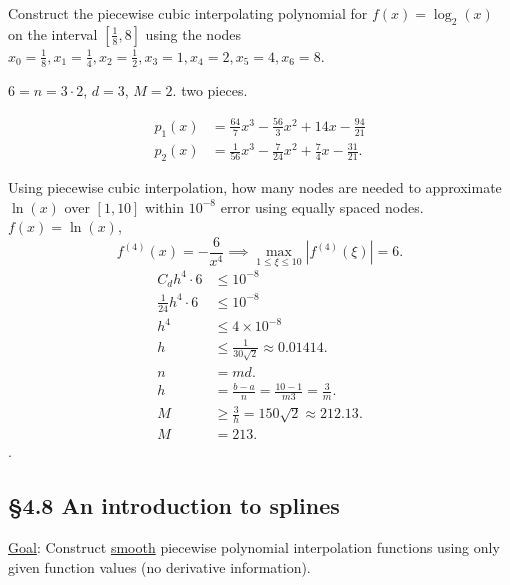 \documentclass[]{article}
\begin{document}
\begin{example}
	Construct the piecewise cubic interpolating polynomial for $f(x) = \log_2(x)$ on the interval $[\frac18,8]$ using the nodes
	$x_0=\frac18,x_1=\frac14,x_2=\frac12,x_3=1,x_4=2,x_5=4,x_6=8$.
	\begin{note}
		$6=n=3\cdot2$, $d=3$, $M=2$. two pieces.
	\end{note}
	\begin{align*}
		p_1(x) &= \frac{64}7x^3 - \frac{56}3x^2 + 14x - \frac{94}{21} \\
		p_2(x) &= \frac1{56}x^3 - \frac7{24}x^2 + \frac74x - \frac{31}{21}.
	\end{align*}
\end{example}
\begin{example}
	Using piecewise cubic interpolation, how many nodes are needed to approximate $\ln(x)$ over $[1,10]$ within $10^{-8}$ error using equally spaced nodes.
	$f(x) = \ln(x)$, $$ f^{(4)}(x) = - \frac6{x^4} \implies \max_{1\leq\xi\leq 10} |f^{(4)}(\xi)| = 6.$$
	\begin{align*}
		C_dh^4\cdot 6 &\leq 10^{-8} \\
		\frac1{24}h^4\cdot6 &\leq 10^{-8} \\
		h^4 &\leq 4\times10^{-8} \\
		h &\leq \frac1{30\sqrt2} \approx 0.01414. \\
		n &= md. \\
		h &= \frac{b-a}n = \frac{10-1}{m3} = \frac3m. \\
		M &\geq \frac3h = 150\sqrt2 \approx 212.13. \\
		M &= 213.
	\end{align*}
	.
\end{example}

\subsection*{\S4.8 An introduction to splines}

\ul{Goal}: Construct \ul{smooth} piecewise polynomial interpolation functions using only given function values (no derivative information). 
\end{document}
